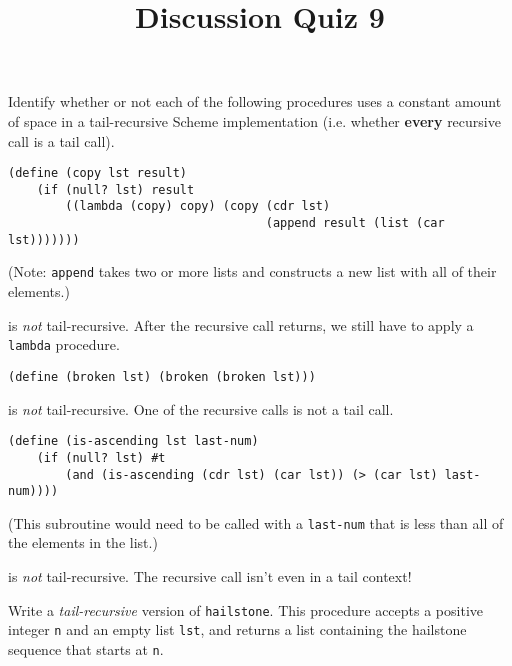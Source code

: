 \documentclass[twoside]{article}
\title{\sc Discussion Quiz 9 \solution{Solutions}}
\newcommand{\solution}[1]{{\color{red}#1}}
\begin{document}
\thispagestyle{empty}
\maketitle

\begin{enumerate}

Identify whether or not each of the following procedures uses a constant amount of space in a tail-recursive Scheme implementation (i.e. whether \textbf{every} recursive call is a tail call).

\begin{lstlisting}
(define (copy lst result)
    (if (null? lst) result
        ((lambda (copy) copy) (copy (cdr lst)
                                    (append result (list (car lst)))))))
\end{lstlisting}

(Note: {\tt append} takes two or more lists and constructs a new list with all of their elements.)

\solution{{\tt copy} is \emph{not} tail-recursive. After the recursive call returns, we still have to apply a {\tt lambda} procedure.}
\newline

\begin{lstlisting}
(define (broken lst) (broken (broken lst)))
\end{lstlisting}

\solution{{\tt broken} is \emph{not} tail-recursive. One of the recursive calls is not a tail call.}
\newline

\begin{lstlisting}
(define (is-ascending lst last-num)
    (if (null? lst) #t
        (and (is-ascending (cdr lst) (car lst)) (> (car lst) last-num))))
\end{lstlisting}

(This subroutine would need to be called with a {\tt last-num} that is less than all of the elements in the list.)

\solution{{\tt is-ascending} is \emph{not} tail-recursive. The recursive call isn't even in a tail context!}
\newline


Write a \emph{tail-recursive} version of {\tt hailstone}. This procedure accepts a positive integer {\tt n} and an empty list {\tt lst}, and returns a list containing the hailstone sequence that starts at {\tt n}.


\end{enumerate}
\end{document}
